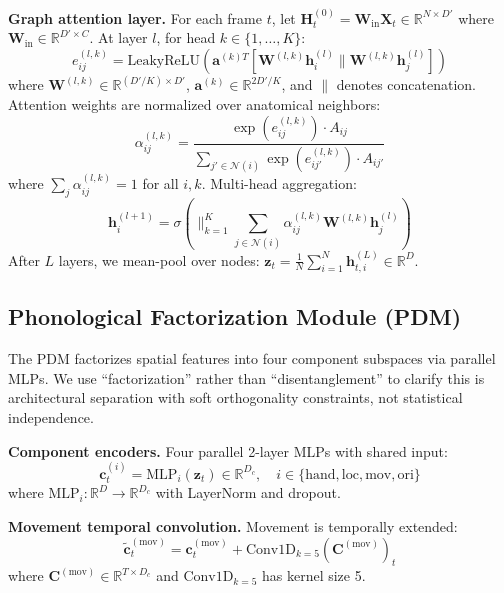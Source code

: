 \documentclass{article}
\theoremstyle{definition}
\theoremstyle{remark}
\newcommand{\pdm}{\textsc{PDM}}
\begin{document}
\textbf{Graph attention layer.} For each frame $t$, let $\mathbf{H}_t^{(0)} = \mathbf{W}_{\text{in}} \mathbf{X}_t \in \mathbb{R}^{N \times D'}$ where $\mathbf{W}_{\text{in}} \in \mathbb{R}^{D' \times C}$. At layer $l$, for head $k \in \{1,\ldots,K\}$:
\begin{equation}
e_{ij}^{(l,k)} = \text{LeakyReLU}\left(\mathbf{a}^{(k)T} [\mathbf{W}^{(l,k)} \mathbf{h}_i^{(l)} \| \mathbf{W}^{(l,k)} \mathbf{h}_j^{(l)}]\right)
\end{equation}
where $\mathbf{W}^{(l,k)} \in \mathbb{R}^{(D'/K) \times D'}$, $\mathbf{a}^{(k)} \in \mathbb{R}^{2D'/K}$, and $\|$ denotes concatenation. Attention weights are normalized over anatomical neighbors:
\begin{equation}
\alpha_{ij}^{(l,k)} = \frac{\exp(e_{ij}^{(l,k)}) \cdot A_{ij}}{\sum_{j' \in \mathcal{N}(i)} \exp(e_{ij'}^{(l,k)}) \cdot A_{ij'}}
\end{equation}
where $\sum_{j} \alpha_{ij}^{(l,k)} = 1$ for all $i, k$. Multi-head aggregation:
\begin{equation}
\mathbf{h}_i^{(l+1)} = \sigma\left( \Big\|_{k=1}^{K} \sum_{j \in \mathcal{N}(i)} \alpha_{ij}^{(l,k)} \mathbf{W}^{(l,k)} \mathbf{h}_j^{(l)} \right)
\end{equation}
After $L$ layers, we mean-pool over nodes: $\mathbf{z}_t = \frac{1}{N} \sum_{i=1}^{N} \mathbf{h}_{t,i}^{(L)} \in \mathbb{R}^{D}$.

\subsection{Phonological Factorization Module (PDM)}

The \pdm{} factorizes spatial features into four component subspaces via parallel MLPs. We use ``factorization'' rather than ``disentanglement'' to clarify this is architectural separation with soft orthogonality constraints, not statistical independence.

\textbf{Component encoders.} Four parallel 2-layer MLPs with shared input:
\begin{equation}
\mathbf{c}_t^{(i)} = \text{MLP}_i(\mathbf{z}_t) \in \mathbb{R}^{D_c}, \quad i \in \{\text{hand}, \text{loc}, \text{mov}, \text{ori}\}
\end{equation}
where $\text{MLP}_i: \mathbb{R}^D \to \mathbb{R}^{D_c}$ with LayerNorm \citep{ba2016layer} and dropout.

\textbf{Movement temporal convolution.} Movement is temporally extended:
\begin{equation}
\tilde{\mathbf{c}}_t^{(\text{mov})} = \mathbf{c}_t^{(\text{mov})} + \text{Conv1D}_{k=5}(\mathbf{C}^{(\text{mov})})_t
\end{equation}
where $\mathbf{C}^{(\text{mov})} \in \mathbb{R}^{T \times D_c}$ and $\text{Conv1D}_{k=5}$ has kernel size 5.
\end{document}
